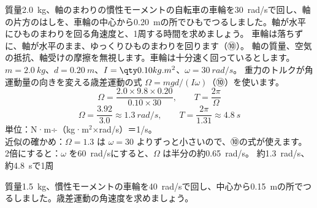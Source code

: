 \begin{phreidai}\label{ph:力-7:ex16}
質量\qty{2.0}{kg}、軸のまわりの慣性モーメントの自転車の車輪を\qty{30}{rad/s}で回し、軸の片方のはしを、車輪の中心から\qty{0.20}{m}の所でひもでつるしました。軸が水平にひものまわりを回る角速度と、1周する時間を求めましょう。
\phbamen
車輪は落ちずに、軸が水平のまま、ゆっくりひものまわりを回ります（⑩）。
\phmushi
軸の質量、空気の抵抗、軸受けの摩擦を無視します。車輪は十分速く回っているとします。
\phzu
$m=\qty{2.0}{kg}$、$d=\qty{0.20}{m}$、$I=\pxhI{0.10}$、$\omega=\qty{30}{rad/s}$。
\phriyu
重力のトルクが角運動量の向きを変える歳差運動の式 $\Omega=mgd/(I\omega)$（⑩）を使います。
\phtateru
\[\Omega=\frac{2.0\times9.8\times0.20}{0.10\times30},\qquad T=\frac{2\pi}{\Omega}\]
\phtoku
\[\Omega=\frac{3.92}{3.0}\approx\qty{1.3}{rad/s},\qquad T=\frac{2\pi}{1.31}\approx\qty{4.8}{s}\]
\phtashikame
単位：N·m÷（kg·m$^2$×rad/s）＝1/s。\\
近似の確かめ：$\Omega=1.3$ は $\omega=30$ よりずっと小さいので、⑩の式が使えます。\\
2倍にすると：$\omega$ を\qty{60}{rad/s}にすると、$\Omega$ は半分の約\qty{0.65}{rad/s}。
\kotae 約\qty{1.3}{rad/s}、約\qty{4.8}{s}で1周
\end{phreidai}
\begin{jibun}
質量\qty{1.5}{kg}、慣性モーメントの車輪を\qty{40}{rad/s}で回し、中心から\qty{0.15}{m}の所でつるしました。歳差運動の角速度を求めましょう。
\end{jibun}

